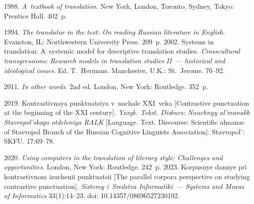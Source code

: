   \begin{multicols}{2}

\renewcommand{\bibname}{\protect\rmfamily References}

{\small\frenchspacing
 {%
 \begin{thebibliography}{99}
 
 1988. \textit{A~textbook of translation}. New York, London, Toronto, Sydney, Tokyo: 
Prentice Hall. 402~p.   

 1994. \textit{The translator in the text: On reading Russian 
literature in English}. Evanston, IL: Northwestern University Press. 209~p.
 2002. Systems in translation: A~systemic model for 
descriptive translation studies. \textit{Crosscultural transgressions: Research models in 
translation studies II~--- historical and ideological issues}. Ed. T.~Hermans. 
Manchester, U.K.: St.\ Jerome. 76--92.

 2011. \textit{In other words}. 2nd ed. London, New York: 
Routledge. 352~p.

 2019. Kont\-ras\-tiv\-naya punk\-tu\-a\-tsiya v~na\-cha\-le XXI~veka 
[Contrastive punctuation at the beginning of the XXI century]. \textit{Yazyk. Tekst. 
Diskurs: Nauchnyy al'manakh Stavropol'skogo otdeleniya RALK} [Language. Text. 
Discourse: Scientific almanac of Stavropol Branch of the Russian Cognitive 
Linguists Association].  Stavropol': SKFU. 17:69--78.

 2020. \textit{Using computers in the translation of literary style: 
Challenges and opportunities}. London, New York: Routledge. 242~p.
 2023. Kor\-pus\-nye dan\-nye pri 
kont\-ras\-tiv\-nom izu\-che\-nii punk\-tu\-a\-tsii [The parallel corpora perspective on studying 
contrastive punctuation]. \textit{Sistemy i~Sredstva Informatiki~--- Systems and Means of 
Informatics} 33(1):14--23. doi: 10.14357/08696527230102.


\end{thebibliography}}}
\end{multicols}
